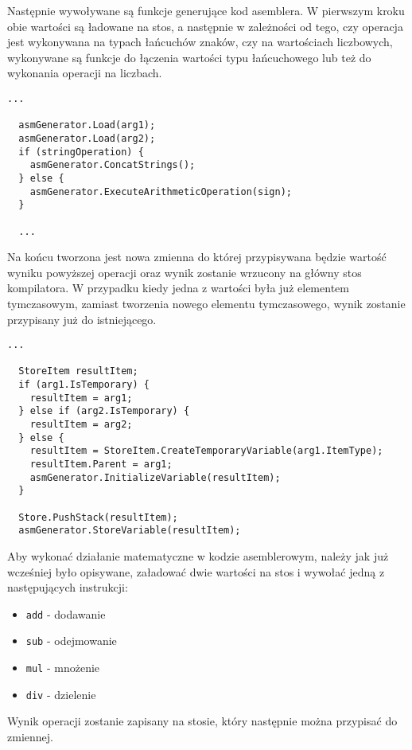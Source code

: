 \par Następnie wywoływane są funkcje generujące kod asemblera. W pierwszym kroku obie wartości są ładowane na stos, a następnie w zależności od tego, czy operacja jest wykonywana na typach łańcuchów znaków, czy na wartościach liczbowych, wykonywane są funkcje do łączenia wartości typu łańcuchowego lub też do wykonania operacji na liczbach.

\begin{lstlisting}[language=CSharp, caption=Implementacja funkcji obsługującej działania matematyczne cz.2, label=alg:arytm3]
  ...

  asmGenerator.Load(arg1);
  asmGenerator.Load(arg2);
  if (stringOperation) {
    asmGenerator.ConcatStrings();
  } else {
    asmGenerator.ExecuteArithmeticOperation(sign);
  }

  ...
\end{lstlisting}

\par Na końcu tworzona jest nowa zmienna do której przypisywana będzie wartość wyniku powyższej operacji oraz wynik zostanie wrzucony na główny stos kompilatora. W przypadku kiedy jedna z wartości była już elementem tymczasowym, zamiast tworzenia nowego elementu tymczasowego, wynik zostanie przypisany już do istniejącego.

\begin{lstlisting}[language=CSharp, caption=Implementacja funkcji obsługującej działania matematyczne cz.3, label=alg:arytm4]
  ...

  StoreItem resultItem;
  if (arg1.IsTemporary) {
    resultItem = arg1;
  } else if (arg2.IsTemporary) {
    resultItem = arg2;
  } else {
    resultItem = StoreItem.CreateTemporaryVariable(arg1.ItemType);
    resultItem.Parent = arg1;
    asmGenerator.InitializeVariable(resultItem);
  }

  Store.PushStack(resultItem);
  asmGenerator.StoreVariable(resultItem);
\end{lstlisting}

\par Aby wykonać działanie matematyczne w kodzie asemblerowym, należy jak już wcześniej było opisywane, załadować dwie wartości na stos i wywołać jedną z następujących instrukcji:
\begin{itemize}
  \item \texttt{add} - dodawanie
  \item \texttt{sub} - odejmowanie
  \item \texttt{mul} - mnożenie
  \item \texttt{div} - dzielenie
\end{itemize}
Wynik operacji zostanie zapisany na stosie, który następnie można przypisać do zmiennej.

